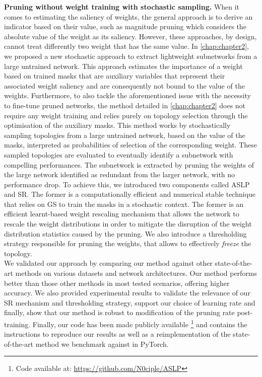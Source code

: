 \noindent \textbf{Pruning without weight training with stochastic sampling.}
When it comes to estimating the saliency of weights, the general approach is to
derive an indicator based on their value, such as magnitude pruning which
considers the absolute value of the weight as its saliency. However, these
approaches, by design, cannot treat differently two weight that has the same
value. In \cref{chap:chapter2}, we proposed a new stochastic approach to extract
lightweight subnetworks from a large untrained network. This approach estimates
the importance of a weight based on trained masks that are auxiliary variables
that represent their associated weight saliency and are consequently not bound
to the value of the weights. Furthermore, to also tackle the aforementioned
issue with the necessity to fine-tune pruned networks, the method detailed in
\cref{chap:chapter2} does not require any weight training and relies purely on
topology selection through the optimisation of the auxiliary masks. This method
works by stochastically sampling topologies from a large untrained network,
based on the value of the masks, interpreted as probabilities of selection of
the corresponding weight. These sampled topologies are evaluated to eventually
identify a subnetwork with compelling performances. The subnetwork is extracted
by pruning the weights of the large network identified as redundant from the
larger network, with no performance drop. To achieve this, we introduced two
components called \acf{ASLP} and \acf{SR}. The former is a computationally
efficient and numerical stable technique that relies on \acl{GS} to train the
masks in a stochastic context. The former is an efficient learnt-based weight
rescaling mechanism that allows the network to rescale the weight distributions
in order to mitigate the disruption of the weight distribution statistics caused
by the pruning. We also introduce a thresholding strategy responsible for
pruning the weights, that allows to effectively \emph{freeze} the topology.\\

We validated our approach by comparing our method against other state-of-the-art
methods on various datasets and network architectures. Our method performs
better than those other methods in most tested scenarios, offering higher
accuracy. We also provided experimental results to validate the relevance of our
\ac{SR} mechanism and thresholding strategy, support our choice of learning rate
and finally, show that our method is robust to modification of the pruning rate
post-training. Finally, our code has been made publicly available \footnote{Code
available at: \url{https://github.com/N0ciple/ASLP}} and contains the
instructions to reproduce our results as well as a reimplementation of the
state-of-the-art method we benchmark against in PyTorch.\\ 

